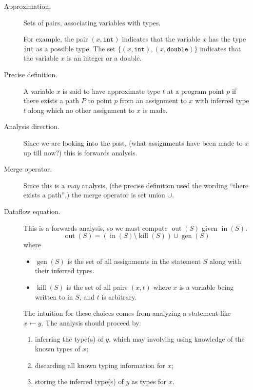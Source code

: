 \documentclass[11pt,letterpaper]{article}
\DeclareMathOperator{\inputOp}{in}
\DeclareMathOperator{\outputOp}{out}
\DeclareMathOperator{\killOp}{kill}
\DeclareMathOperator{\genOp}{gen}
\newcommand{\In}[1]{\inputOp{(#1)}}
\newcommand{\Out}[1]{\outputOp{(#1)}}
\newcommand{\Kill}[1]{\killOp{(#1)}}
\newcommand{\Gen}[1]{\genOp{(#1)}}
\newcommand{\intty}{\mathtt{int}}
\newcommand{\doublety}{\mathtt{double}}
\begin{document}
\begin{description}
    \item[Approximation.]
        Sets of pairs, associating variables with types.

        For example, the pair $(x, \intty)$ indicates that the
        variable $x$ has the type \texttt{int} as a possible type. The set
        $\{(x, \intty), (x, \doublety)\}$ indicates that the variable $x$ is an
        integer or a double.

    \item[Precise definition.]
        A variable $x$ is said to have approximate type $t$ at a program point
        $p$ if there exists a path $P$ to point $p$ from an assignment to $x$
        with inferred type $t$ along which no other assignment to $x$ is made.

    \item[Analysis direction.]
        Since we are looking into the past, (what assignments have been made to
        $x$ up till now?) this is forwards analysis.

    \item[Merge operator.]
        Since this is a \emph{may} analysis, (the precise definition used the
        wording ``there exists a path'',) the merge operator is set union
        $\cup$.

    \item[Dataflow equation.]
        This is a forwards analysis, so we must compute $\Out{S}$ given
        $\In{S}$.
        \begin{equation*}
            \Out{S} = \left(\In{S} \setminus \Kill{S}\right) \cup \Gen{S}
        \end{equation*}
        where
        \begin{itemize}
            \item $\Gen{S}$ is the set of all assignments in the statement $S$
                along with their inferred types.

            \item $\Kill{S}$ is the set of all pairs $(x, t)$ where $x$ is a
                variable being written to in $S$, and $t$ is arbitrary.
        \end{itemize}

        The intuition for these choices comes from analyzing a statement like
        $x \gets y$. The analysis should proceed by:
        \begin{enumerate}
            \item inferring the type(s) of $y$, which may involving using
                knowledge of the known types of $x$;
            \item discarding all known typing information for $x$;
            \item storing the inferred type(s) of $y$ as types for $x$.
        \end{enumerate}


\end{description}
\end{document}
